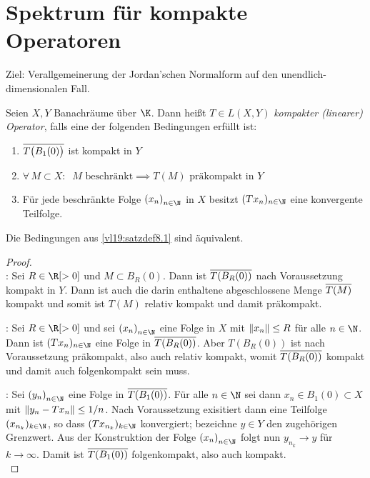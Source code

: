 \chapter{Spektrum für kompakte Operatoren}
Ziel: Verallgemeinerung der Jordan'schen Normalform auf den
unendlich-dimensionalen Fall.

\begin{thDef} \label{vl19:satzdef8.1}
    Seien $X,Y$ Banachräume über $\K$. Dann heißt $T\in L(X,Y)$
    \emph{kompakter (linearer) Operator}, falls eine der folgenden Bedingungen
    erfüllt ist:
    \begin{enumerate}[(1)]
        \item \label{vl19:satzdef8.1:1}
            $\overline{T\bigl(B_1(0)\bigr)}$ ist kompakt in $Y$
        \item \label{vl19:satzdef8.1:2}
            $\forall\,M\subset X\colon \;\; 
                M \text{ beschränkt} \implies T(M)\text{ präkompakt in $Y$}$
        \item \label{vl19:satzdef8.1:3}
            Für jede beschränkte Folge $\nSeq x$ in $X$ besitzt
            $(Tx_n)_{n\in\N}$ eine konvergente Teilfolge.
    \end{enumerate}
\end{thDef}

\nnSatz Die Bedingungen aus \cref{vl19:satzdef8.1} sind äquivalent.
%
\begin{proof}
    \hfill\\%
    : Sei $R\in\R[>0]$ und $M\subset B_R(0)$. Dann ist
    $\overline{T(B_R(0))}$ nach Voraussetzung kompakt in $Y$. Dann ist auch
    die darin enthaltene abgeschlossene Menge $\overline{T(M)}$ kompakt und
    somit ist $T(M)$ relativ kompakt und damit präkompakt.
    
    : Sei $R\in\R[>0]$ und sei $\nSeq x$ eine Folge in $X$
    mit $\lVert x_n\rVert\leq R$ für alle $n\in\N$. Dann ist
    $(Tx_n)_{n\in\N}$ eine Folge in $\overline{T(B_R(0))}$. Aber $T(B_R(0))$
    ist nach Voraussetzung präkompakt, also auch relativ kompakt, womit
    $\overline{T(B_R(0))}$ kompakt und damit auch folgenkompakt sein muss.
    
    : Sei $\nSeq y$ eine Folge in $\overline{T(B_1(0))}$.
    Für alle $n\in\N$ sei dann $x_n\in B_1(0)\subset X$ mit $\lVert y_n-Tx_n\rVert
    \leq 1/n$. Nach Voraussetzung exisitiert dann eine Teilfolge
    $(x_{n_k})_{k\in\N}$, so dass $(Tx_{n_k})_{k\in\N}$ konvergiert; bezeichne
    $y\in Y$ den zugehörigen Grenzwert. Aus der Konstruktion der Folge $\nSeq x$
    folgt nun $y_{n_k}\to y$ für $k\to\infty$. Damit ist
    $\overline{T(B_1(0))}$ folgenkompakt, also auch kompakt.
    \\
\end{proof}

